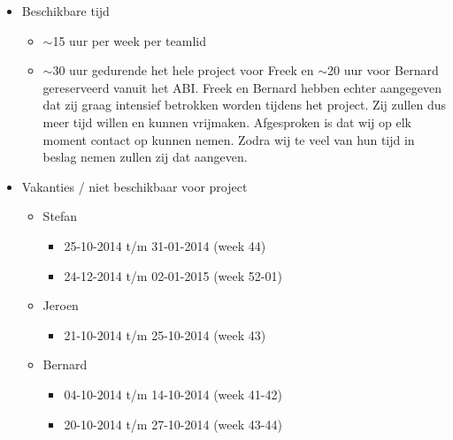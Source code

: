 \begin{itemize}
 \item Beschikbare tijd
 \begin{itemize}
  \item $\sim$15 uur per week per teamlid
  \item $\sim$30 uur gedurende het hele project voor Freek en $\sim$20 uur voor Bernard
        gereserveerd vanuit het ABI. Freek en Bernard hebben echter aangegeven dat zij graag
        intensief betrokken worden tijdens het project. Zij zullen dus meer tijd willen
        en kunnen vrijmaken. Afgesproken is dat wij op elk moment contact op kunnen nemen.
        Zodra wij te veel van hun tijd in beslag nemen zullen zij dat aangeven.
 \end{itemize}


 \item Vakanties / niet beschikbaar voor project
 \begin{itemize}

  \item Stefan
  \begin{itemize}
   \item 25-10-2014 t/m 31-01-2014 (week 44)
   \item 24-12-2014 t/m 02-01-2015 (week 52-01)
  \end{itemize}

  \item Jeroen
  \begin{itemize}
   \item 21-10-2014 t/m 25-10-2014 (week 43)
  \end{itemize}

  \item Bernard
   \begin{itemize}
    \item 04-10-2014 t/m 14-10-2014 (week 41-42)
    \item 20-10-2014 t/m 27-10-2014 (week 43-44)
   \end{itemize}

 \end{itemize}
\end{itemize}
